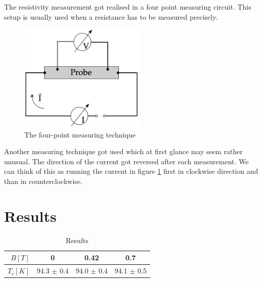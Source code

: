 \documentclass[a4paper,parskip,11pt, DIV12]{scrreprt}
\begin{document}
The resistivity measurement got realised in a four point measuring circuit. This setup is usually used when a resistance has to be measured precisely. 

\begin{figure}[H]
\centering
\includegraphics[width=6cm]{vierpunkt.png}
\caption{The four-point measuring technique}
\label{vierpunkt}
\end{figure}


Another measuring technique got used which at first glance may seem rather unusual. The direction of the current got reversed after each measurement. We can think of this as running the current in figure \ref{vierpunkt} first in clockwise direction and than in counterclockwise.


\chapter{Results}

\begin{framed}
\begin{table}[H]
\centering
\renewcommand{\arraystretch}{1.2} %
\setlength{\tabcolsep}{3mm} %
\footnotesize
\begin{tabular}{r|ccc}
$B[T]$ & 0 & 0.42 & 0.7 \\ 
\hline 
$T_{c} [K]$ & 94.3 $\pm$ 0.4 & 94.0 $\pm$ 0.4 & 94.1 $\pm$ 0.5 \\ 
\end{tabular}
\caption[]{Results}
\end{table} 
\end{framed}
\end{document}
